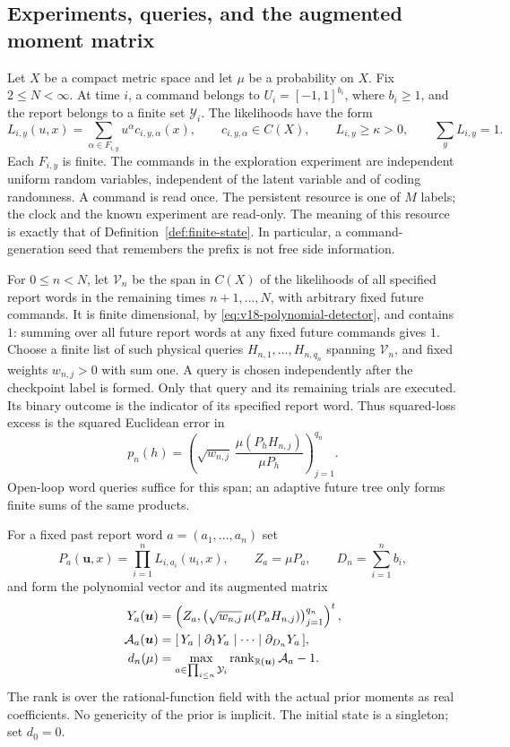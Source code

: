 \documentclass[11pt]{amsart}
\theoremstyle{definition}\newtheorem{definition}[theorem]{Definition}
\theoremstyle{remark}\newtheorem{remark}[theorem]{Remark}
\newcommand{\R}{\mathbb R}\newcommand{\N}{\mathbb N}\newcommand{\C}{\mathbb C}
\begin{document}
\subsection{Experiments, queries, and the augmented moment matrix}
Let $X$ be a compact metric space and let $\mu$ be a probability on $X$.
Fix $2\le N<\infty$. At time $i$, a command belongs to
$U_i=[-1,1]^{b_i}$, where $b_i\ge1$, and the report belongs to a finite set $\mathcal Y_i$.
The likelihoods have the form
\begin{equation}\label{eq:v18-polynomial-detector}
 L_{i,y}(u,x)=\sum_{\alpha\in F_{i,y}}u^\alpha c_{i,y,\alpha}(x),
 \qquad c_{i,y,\alpha}\in C(X),\qquad
 L_{i,y}\ge\kappa>0,\qquad \sum_yL_{i,y}=1.
\end{equation}
Each $F_{i,y}$ is finite. The commands in the exploration experiment are
independent uniform random variables, independent of the latent variable
and of coding randomness. A command is read once. The persistent resource
is one of $M$ labels; the clock and the known experiment are read-only.
The meaning of this resource is exactly that of
Definition~\ref{def:finite-state}. In particular, a command-generation
seed that remembers the prefix is not free side information.

For $0\le n<N$, let $\mathscr V_n$ be the span in $C(X)$ of the
likelihoods of all specified report words in the remaining times
$n+1,\ldots,N$, with arbitrary fixed future commands. It is finite
dimensional, by \eqref{eq:v18-polynomial-detector}, and contains $1$:
summing over all future report words at any fixed future commands gives
$1$. Choose a finite list of such physical queries
$H_{n,1},\ldots,H_{n,q_n}$ spanning $\mathscr V_n$, and fixed weights
$w_{n,j}>0$ with sum one. A query is chosen independently after the
checkpoint label is formed. Only that query and its remaining trials
are executed. Its binary outcome is the indicator of its specified
report word. Thus squared-loss excess is the squared Euclidean error in
\[
 p_n(h)=\left(\sqrt{w_{n,j}}\,
             \frac{\mu(P_hH_{n,j})}{\mu P_h}\right)_{j=1}^{q_n}.
\]
Open-loop word queries suffice for this span; an adaptive future tree
only forms finite sums of the same products.

For a fixed past report word $a=(a_1,\ldots,a_n)$ set
\[
 P_a(\boldsymbol u,x)=\prod_{i=1}^nL_{i,a_i}(u_i,x),\qquad
 Z_a=\mu P_a,\qquad D_n=\sum_{i=1}^nb_i,
\]
and form the polynomial vector and its augmented matrix
\begin{equation}\label{eq:v18-augmented-matrix}
 \begin{split}
 Y_a(\boldsymbol u)&=
 \left(Z_a,\bigl(\sqrt{w_{n,j}}\,\mu(P_aH_{n,j})\bigr)_{j=1}^{q_n}\right)^t,\\
 \mathcal A_a(\boldsymbol u)&=
 [\,Y_a\mid\partial_1Y_a\mid\cdots\mid\partial_{D_n}Y_a\,],\\
 d_n(\mu)&=\max_{a\in\prod_{i\le n}\mathcal Y_i}
       \rank_{\R(\boldsymbol u)}\mathcal A_a-1.
 \end{split}
\end{equation}
The rank is over the rational-function field with the actual prior
moments as real coefficients. No genericity of the prior is implicit.
The initial state is a singleton; set $d_0=0$.
\end{document}
